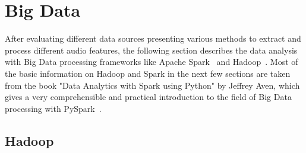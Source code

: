 
\section{Big Data}\label{bdf}

After evaluating different data sources presenting various methods to extract and process different audio features, the following section describes the data analysis with Big Data processing frameworks like Apache Spark~\cite{spark} and Hadoop~\cite{hadoop}. Most of the basic information on Hadoop and Spark in the next few sections are taken from the book "Data Analytics with Spark using Python" by Jeffrey Aven, which gives a very comprehensible and practical introduction to the field of Big Data processing with PySpark~\cite{sparkbook1}. 

\subsection{Hadoop}

